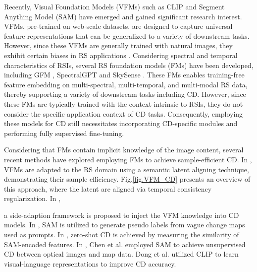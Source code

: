 Recently, Visual Foundation Models (VFMs) such as CLIP \cite{radford2021CLIP} and Segment Anything Model (SAM) \cite{Kirillov2023Segment} have emerged and gained significant research interest. VFMs, pre-trained on web-scale datasets, are designed to capture universal feature representations that can be generalized to a variety of downstream tasks. However, since these VFMs are generally trained with natural images, they exhibit certain biases in RS applications \cite{ji2024segment}. Considering spectral and temporal characteristics of RSIs, several RS foundation models (FMs) have been developed, including GFM \cite{mendieta2023gfm}, SpectralGPT \cite{hong2024spectralgpt} and SkySense \cite{guo2024skysense}. These FMs enables training-free feature embedding on multi-spectral, multi-temporal, and multi-modal RS data, thereby supporting a variety of downstream tasks including CD. However, since these FMs are typically trained with the context intrinsic to RSIs, they do not consider the specific application context of CD tasks. Consequently, employing these models for CD still necessitates incorporating CD-specific modules and performing fully supervised fine-tuning.

Considering that FMs contain implicit knowledge of the image content, several recent methods have explored employing FMs to achieve sample-efficient CD. In \cite{ding2024samcd}, VFMs are adapted to the RS domain using a semantic latent aligning technique, demonstrating their sample efficiency. Fig.\ref{fig.VFM_CD} presents an overview of this approach, where the latent are aligned via temporal consistency regularization. In \cite{li2024new},



a side-adaption framework is proposed to inject the VFM knowledge into CD models. In \cite{wang2023cs}, SAM is utilized to generate pseudo labels from vague change maps used as prompts. In \cite{zheng2024segment}, zero-shot CD is achieved by measuring the similarity of SAM-encoded features. In \cite{chen2024change}, Chen et al. employed SAM to achieve unsupervised CD between optical images and map data. Dong et al. \cite{dong2024changeclip} utilized CLIP to learn visual-language representations to improve CD accuracy.


